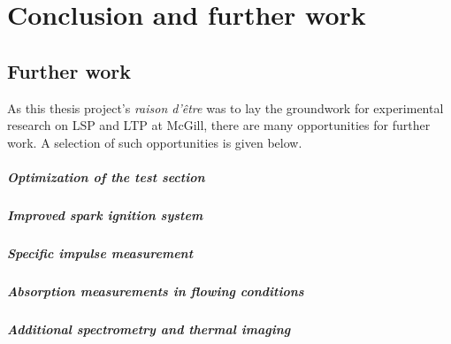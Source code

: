 \chapter{Conclusion and further work}

    \section{Further work}
        As this thesis project's \emph{raison d'être} was to lay the groundwork for experimental research on LSP and LTP at McGill, there are many opportunities for further work. A selection of such opportunities is given below.

        \paragraph{Optimization of the test section}

        \paragraph{Improved spark ignition system}

        \paragraph{Specific impulse measurement}

        \paragraph{Absorption measurements in flowing conditions}

        \paragraph{Additional spectrometry and thermal imaging}